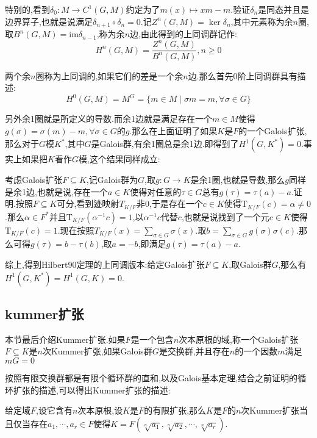 特别的,看到$\delta_0:M\to C^1(G,M)$约定为了$m(x)\mapsto xm-m$.验证$\delta_n$是同态并且是边界算子,也就是说满足$\delta_ {n+1}\circ\delta_n=0$.记$Z^n(G,M)=\ker\delta_n$,其中元素称为余$n$圈,取$B^n(G,M)=\mathrm{im}\delta_{n-1}$,称为余$n$边,由此得到的上同调群记作:
$$H^n(G,M)=\frac{Z^n(G,M)}{B^n(G,M)},n\ge0$$

两个余$n$圈称为上同调的,如果它们的差是一个余$n$边.那么首先0阶上同调群具有描述:
$$H^0(G,M)=M^G=\{m\in M\mid \sigma m=m,\forall \sigma\in G\}$$

另外余1圈就是所定义的导数.而余1边就是满足存在一个$m\in M$使得$g(\sigma)=\sigma(m)-m,\forall \sigma\in G$的$g$.那么在上面证明了如果$K$是$F$的一个Galois扩张,那么对于$G$模$K^*$,其中$G$是Galois群,有余1圈总是余1边.即得到了$H^1(G,K^*)=0$.事实上如果把$K$看作$G$模,这个结果同样成立:

考虑Galois扩张$F\subseteq K$,记Galois群为$G$,取$g:G\to K$是余1圈,也就是导数,那么$g$同样是余1边,也就是说,存在一个$a\in K$使得对任意的$\tau\in G$总有$g(\tau)=\tau(a)-a$.证明.按照$F\subseteq K$可分,看到迹映射$T_ {K/F}$非0,于是存在一个$c\in K$使得$\mathrm{T}_{K/F}(c)=\alpha\not=0$.那么$\alpha\in F^*$并且$\mathrm{T}_{K/F}(\alpha^{-1}c)=1$,以$\alpha^{-1}c$代替$c$,也就是说找到了一个元$c\in K$使得$\mathrm{T}_{K/F}(c)=1$.现在按照$T_ {K/F}(x)=\sum_{\sigma\in G}\sigma(x)$.取$b=\sum_{\sigma\in G}g(\sigma)\sigma(c)$.那么可得$g(\tau)=b-\tau(b)$,取$a=-b$,即满足$g(\tau)=\tau(a)-a$.

综上,得到Hilbert90定理的上同调版本:给定Galois扩张$F\subseteq K$,取Galois群$G$,那么有$H^1(G,K^*)=H^1(G,K)=0$.
\newpage
\subsection{kummer扩张}

本节最后介绍Kummer扩张.如果$F$是一个包含$n$次本原根的域,称一个Galois扩张$F\subseteq K$是$n$次Kummer扩张,如果Galois群$G$是交换群,并且存在$n$的一个因数$m$满足$mG=0$

按照有限交换群都是有限个循环群的直和,以及Galois基本定理,结合之前证明的循环扩张的描述,可以得出Kummer扩张的描述:

给定域$F$,设它含有$n$次本原根,设$K$是$F$的有限扩张,那么$K$是$F$的$n$次Kummer扩张当且仅当存在$a_1,\cdots,a_r\in F$使得$K=F(\sqrt[n]{a_1},\sqrt[n]{a_2},\cdots,\sqrt[n]{a_r})$.

